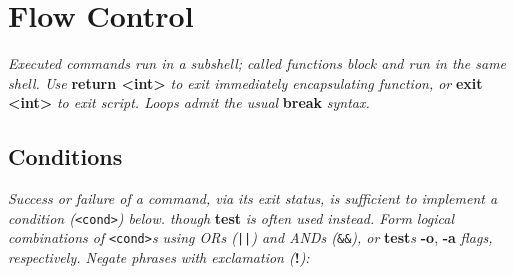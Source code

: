 \section{Flow Control}
\textit{Executed commands run in a subshell; called functions block and run in the same shell. Use }\textbf{return <int>}\textit{ to exit immediately encapsulating function, or }\textbf{exit <int>}\textit{ to exit script. Loops admit the usual }\textbf{break}\textit{ syntax.}\\


\subsection*{Conditions}

\textit{Success or failure of a command, via its exit status, is sufficient to implement a condition (}\texttt{<cond>}\textit{) below. though }\textbf{test}\textit{ is often used instead. Form logical combinations of }\texttt{<cond>}\textit{s using ORs (}\texttt{||}\textit{) and ANDs (}\texttt{\&\&}\textit{), or }\textbf{test}\textit{\textquotesingle s }\textbf{-o}, \textbf{-a}\textit{ flags, respectively. Negate phrases with exclamation (}\textbf{!}\textit{):}\\
\\
\\




